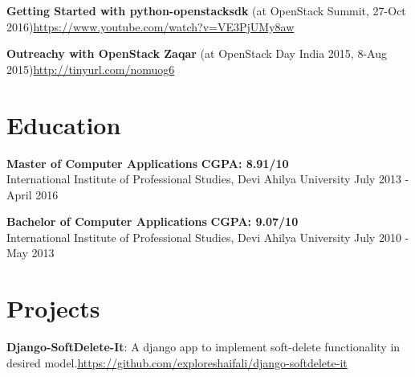 \documentclass[margin,line]{resume}
\begin{document}
\begin{resume}
    \begin{list2}
    \item \textbf{Getting Started with python-openstacksdk } (at OpenStack Summit, 27-Oct 2016)\url{https://www.youtube.com/watch?v=VE3PjUMy8aw}
    \end{list2}

    \begin{list2}
    \item \textbf{Outreachy with OpenStack Zaqar} (at OpenStack Day India 2015, 8-Aug 2015)\url{http://tinyurl.com/nomuog6}
    \end{list2}

    \section{\mysidestyle Education}

    \begin{list2}
	\item \textbf{Master of Computer Applications} \hspace{70mm} \textbf{CGPA: 8.91/10} \\ International Institute of Professional Studies, Devi Ahilya University \hspace{17mm} July 2013 - April 2016
	\end{list2}

	\begin{list2}
	\item \textbf{Bachelor of Computer Applications} \hspace{70mm} \textbf{CGPA: 9.07/10} \\ International Institute of Professional Studies, Devi Ahilya University \hspace{20mm} July 2010 - May 2013
	\end{list2}

    \section{\mysidestyle Projects} 
	\begin{list2}
\item \textbf{Django-SoftDelete-It}: A django app to implement soft-delete functionality in desired model.\url{https://github.com/exploreshaifali/django-softdelete-it}


\end{list2}
\end{resume}
\end{document}
